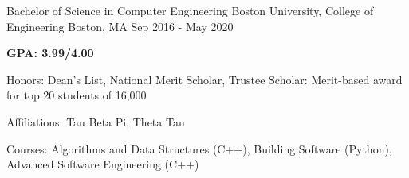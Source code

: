 


\begin{cventries}


\cventry
{Bachelor of Science in Computer Engineering} %
{Boston University, College of Engineering} %
{Boston, MA} %
{Sep 2016 - May 2020} %
{ %
\begin{cvitems}
\item {\textbf{GPA: 3.99/4.00}}
\item {Honors: Dean’s List, National Merit Scholar, Trustee Scholar: Merit-based award for top 20 students of 16,000}
\item {Affiliations: Tau Beta Pi, Theta Tau}
\item {Courses: Algorithms and Data Structures (C++), Building Software (Python), Advanced Software Engineering (C++)}
\end{cvitems}
}


\end{cventries}